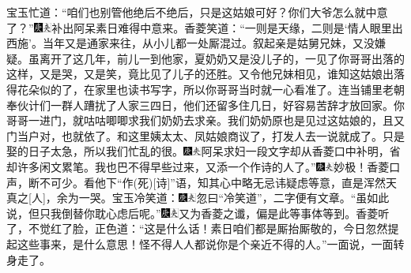 宝玉忙道：“咱们也别管他绝后不绝后，只是这姑娘可好？你们大爷怎么就中意了？”{\includegraphics[width=3mm]{../Images/00004}\includegraphics[width=3mm]{../Images/00012}\footnotesize \kaishu 补出阿呆素日难得中意来。}香菱笑道：“一则是天缘，二则是‘情人眼里出西施’。当年又是通家来往，从小儿都一处厮混过。叙起亲是姑舅兄妹，又没嫌疑。虽离开了这几年，前儿一到他家，夏奶奶又是没儿子的，一见了你哥哥出落的这样，又是哭，又是笑，竟比见了儿子的还胜。又令他兄妹相见，谁知这姑娘出落得花朵似的了，在家里也读书写字，所以你哥哥当时就一心看准了。连当铺里老朝奉伙计们一群人蹧扰了人家三四日，他们还留多住几日，好容易苦辞才放回家。你哥哥一进门，就咕咕唧唧求我们奶奶去求亲。我们奶奶原也是见过这姑娘的，且又门当户对，也就依了。和这里姨太太、凤姑娘商议了，打发人去一说就成了。只是娶的日子太急，所以我们忙乱的很。{\includegraphics[width=3mm]{../Images/00004}\includegraphics[width=3mm]{../Images/00012}\footnotesize \kaishu 阿呆求妇一段文字却从香菱口中补明，省却许多闲文累笔。}我也巴不得早些过来，又添一个作诗的人了。”{\includegraphics[width=3mm]{../Images/00004}\includegraphics[width=3mm]{../Images/00012}\footnotesize \kaishu 妙极！香菱口声，断不可少。看他下“作{(死)}{[}诗{]}”语，知其心中略无忌讳疑虑等意，直是浑然天真之{[}人{]}，余为一哭。}宝玉冷笑道：{\includegraphics[width=3mm]{../Images/00004}\includegraphics[width=3mm]{../Images/00012}\footnotesize \kaishu 忽曰“冷笑道”，二字便有文章。}“虽如此说，但只我倒替你耽心虑后呢。”{\includegraphics[width=3mm]{../Images/00004}\includegraphics[width=3mm]{../Images/00012}\footnotesize \kaishu 又为香菱之谶，偏是此等事体等到。}香菱听了，不觉红了脸，正色道：“这是什么话！素日咱们都是厮抬厮敬的，今日忽然提起这些事来，是什么意思！怪不得人人都说你是个亲近不得的人。”一面说，一面转身走了。

